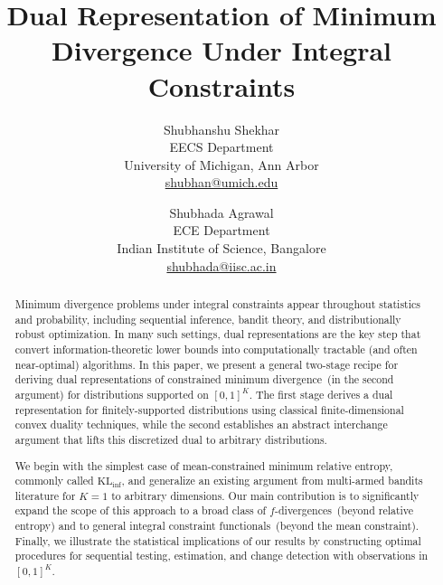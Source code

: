 \documentclass{article}
\title{Dual Representation of Minimum Divergence Under Integral Constraints}
\date{}
\author{Shubhanshu Shekhar \\ EECS Department \\ University of Michigan, Ann Arbor \\ \url{shubhan@umich.edu} \and 
Shubhada Agrawal \\ ECE Department \\ Indian Institute of Science, Bangalore \\ \url{shubhada@iisc.ac.in}}
\theoremstyle{plain}
\theoremstyle{definition}
\newcommand{\KLinf}{\operatorname{KL_{inf}}}
\begin{document}
\maketitle

\begin{abstract}
Minimum divergence problems under integral constraints appear throughout statistics and probability, including sequential inference, bandit theory, and distributionally robust optimization. In many such settings, dual representations are the key step that convert information-theoretic lower bounds into computationally tractable (and often near-optimal) algorithms.  In this paper, we present a general two-stage recipe for deriving dual representations of constrained minimum divergence~(in the second argument) for distributions supported on $[0,1]^K$. The first stage derives a dual representation for finitely-supported distributions using classical finite-dimensional convex duality techniques, while the second establishes an abstract interchange argument that lifts this discretized dual to arbitrary distributions. 

We begin with the simplest case of mean-constrained minimum relative entropy, commonly called $\KLinf$, and generalize an existing argument from multi-armed bandits literature for $K=1$ to arbitrary dimensions. Our main contribution is to significantly expand the scope of this approach  to a broad class of $f$-divergences~(beyond relative entropy) and to general integral constraint functionals~(beyond the mean constraint). Finally, we illustrate the statistical implications of our results by constructing optimal procedures for sequential testing, estimation, and change detection with observations in $[0,1]^K$.  
\end{abstract}

\setcounter{tocdepth}{2}
\tableofcontents
\end{document}
